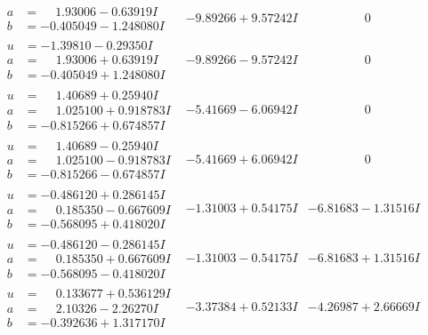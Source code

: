 \documentclass[1p]{elsarticle_modified}
\theoremstyle{definition}
\begin{document}
$$\begin{array}{c|c|c}
\begin{aligned}
a &= \phantom{-}1.93006 - 0.63919 I \\
b &= -0.405049 - 1.248080 I\end{aligned}
 & -9.89266 + 9.57242 I & \phantom{-0.000000 } 0 \\ \hline\begin{aligned}
u &= -1.39810 - 0.29350 I \\
a &= \phantom{-}1.93006 + 0.63919 I \\
b &= -0.405049 + 1.248080 I\end{aligned}
 & -9.89266 - 9.57242 I & \phantom{-0.000000 } 0 \\ \hline\begin{aligned}
u &= \phantom{-}1.40689 + 0.25940 I \\
a &= \phantom{-}1.025100 + 0.918783 I \\
b &= -0.815266 + 0.674857 I\end{aligned}
 & -5.41669 - 6.06942 I & \phantom{-0.000000 } 0 \\ \hline\begin{aligned}
u &= \phantom{-}1.40689 - 0.25940 I \\
a &= \phantom{-}1.025100 - 0.918783 I \\
b &= -0.815266 - 0.674857 I\end{aligned}
 & -5.41669 + 6.06942 I & \phantom{-0.000000 } 0 \\ \hline\begin{aligned}
u &= -0.486120 + 0.286145 I \\
a &= \phantom{-}0.185350 - 0.667609 I \\
b &= -0.568095 + 0.418020 I\end{aligned}
 & -1.31003 + 0.54175 I & -6.81683 - 1.31516 I \\ \hline\begin{aligned}
u &= -0.486120 - 0.286145 I \\
a &= \phantom{-}0.185350 + 0.667609 I \\
b &= -0.568095 - 0.418020 I\end{aligned}
 & -1.31003 - 0.54175 I & -6.81683 + 1.31516 I \\ \hline\begin{aligned}
u &= \phantom{-}0.133677 + 0.536129 I \\
a &= \phantom{-}2.10326 - 2.26270 I \\
b &= -0.392636 + 1.317170 I\end{aligned}
 & -3.37384 + 0.52133 I & -4.26987 + 2.66669 I \\ \hline\begin{aligned}

\end{aligned}
\end{array}$$
\end{document}
